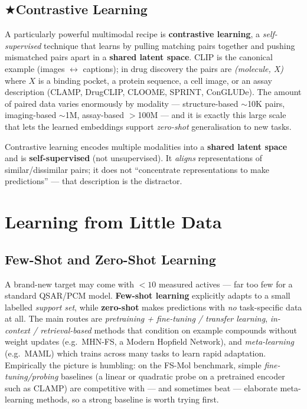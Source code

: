 \documentclass[11pt, oneside]{book}
\makeatletter
\newcommand{\starglyph}{\textcolor{stargold}{\ensuremath{\bigstar}}}
\newcommand{\starsec}[1]{%
  \texorpdfstring{\starglyph\hspace{0.4em}\textcolor{star@frame}{#1}}{#1}}
\makeatother
\begin{document}
\subsection{\starsec{Contrastive Learning}}

A particularly powerful multimodal recipe is \textbf{contrastive learning}, a
\emph{self-supervised} technique that learns by pulling matching pairs together
and pushing mismatched pairs apart in a \textbf{shared latent space}. CLIP is the
canonical example (images $\leftrightarrow$ captions); in drug discovery the pairs
are \emph{(molecule, X)} where $X$ is a binding pocket, a protein sequence, a cell
image, or an assay description (CLAMP, DrugCLIP, CLOOME, SPRINT, ConGLUDe). The
amount of paired data varies enormously by modality --- structure-based
$\sim$10K pairs, imaging-based $\sim$1M, assay-based $>$100M --- and it is exactly
this large scale that lets the learned embeddings support \emph{zero-shot}
generalisation to new tasks.

\begin{notebox}[title={Contrastive learning --- the exact wording}]
Contrastive learning encodes multiple modalities into a \textbf{shared latent
space} and is \textbf{self-supervised} (not unsupervised). It \emph{aligns}
representations of similar/dissimilar pairs; it does not ``concentrate
representations to make predictions'' --- that description is the distractor.
\end{notebox}

\section{Learning from Little Data}
\label{sec:littledata}

\subsection{Few-Shot and Zero-Shot Learning}

A brand-new target may come with $<10$ measured actives --- far too few for a
standard QSAR/PCM model. \textbf{Few-shot learning} explicitly adapts to a small
labelled \emph{support set}, while \textbf{zero-shot} makes predictions with
\emph{no} task-specific data at all. The main routes are
\emph{pretraining + fine-tuning / transfer learning}, \emph{in-context /
retrieval-based} methods that condition on example compounds without weight
updates (e.g.\ MHN-FS, a Modern Hopfield Network), and \emph{meta-learning} (e.g.\
MAML) which trains across many tasks to learn rapid adaptation. Empirically the
picture is humbling: on the FS-Mol benchmark, simple \emph{fine-tuning/probing}
baselines (a linear or quadratic probe on a pretrained encoder such as CLAMP) are
competitive with --- and sometimes beat --- elaborate meta-learning methods, so a
strong baseline is worth trying first.
\end{document}
